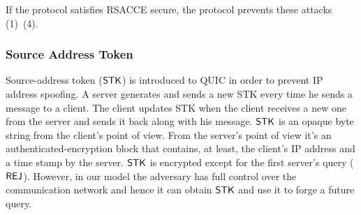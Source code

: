 If the protocol satisfies RSACCE secure, the protocol prevents these attacks (1)~(4).

\subsubsection{Source Address Token} \label{sec:source_address_token}
Source-address token ($\mathsf{STK}$) is introduced to QUIC in order to
prevent IP address spoofing.
A server generates and sends a new STK every time he sends a
message to a client.
The client updates STK when the client receives a new one from
the server and sends it back along with his message.
$\mathsf{STK}$ is an opaque byte string from the client's point of view.
From the server's point of view it's an authenticated-encryption
block that contains, at least, the client's IP address and a time
stamp by the server.
$\mathsf{STK}$ is encrypted except for the first server's query ($\mathsf{REJ}$).
However, in our model the adversary has full control over the
communication network and hence it can obtain $\mathsf{STK}$ and use it to
forge a future query.
